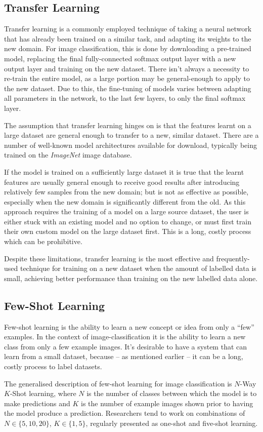 \documentclass{report}
\begin{document}
\subsection{Transfer Learning} \label{transfer-learning}
Transfer learning is a commonly employed technique of taking a neural network that has already been trained on a similar task, and adapting its weights to the new domain. For image classification, this is done by downloading a pre-trained model, replacing the final fully-connected softmax output layer with a new output layer and training on the new dataset. There isn't always a necessity to re-train the entire model, as a large portion may be general-enough to apply to the new dataset. Due to this, the fine-tuning of models varies between adapting all parameters in the network, to the last few layers, to only the final softmax layer.  \par
The assumption that transfer learning hinges on is that the features learnt on a large dataset are general enough to transfer to a new, similar dataset. There are a number of well-known model architectures available for download, typically being trained on the \textit{ImageNet} image database\parencite{ilsvr}. \par
If the model is trained on a sufficiently large dataset it is true that the learnt features are usually general enough to receive good results after introducing relatively few samples from the new domain; but is not as effective as possible, especially when the new domain is significantly different from the old. As this approach requires the training of a model on a large source dataset, the user is either stuck with an existing model and no option to change, or must first train their own custom model on the large dataset first. This is a long, costly process which can be prohibitive. \par
Despite these limitations, transfer learning is the most effective and frequently-used technique for training on a new dataset when the amount of labelled data is small, achieving better performance than training on the new labelled data alone. \par

\subsection{Few-Shot Learning}
Few-shot learning is the ability to learn a new concept or idea from only a ``few'' examples. In the context of image-classification it is the ability to learn a new class from only a few example images. It's desirable to have a system that can learn from a small dataset, because -- as mentioned earlier -- it can be a long, costly process to label datasets. \par
The generalised description of few-shot learning for image classification is $N$-Way $K$-Shot learning, where $N$ is the number of classes between which the model is to make predictions and $K$ is the number of example images shown prior to having the model produce a prediction. Researchers tend to work on combinations of $N \in \{5, 10, 20\}$, $K \in \{1, 5\}$, regularly presented as one-shot and five-shot learning.
\end{document}

